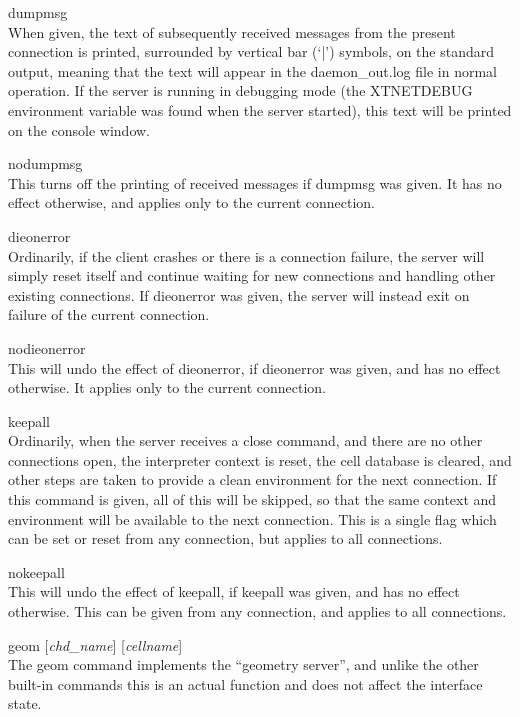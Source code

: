\begin{description}
\item{\vt dumpmsg}\\
When given, the text of subsequently received messages from the
present connection is printed, surrounded by vertical bar (`{\vt |}')
symbols, on the standard output, meaning that the text will appear in
the {\vt daemon\_out.log} file in normal operation.  If the server is
running in debugging mode (the {\et XTNETDEBUG} environment variable
was found when the server started), this text will be printed on the
console window.

\item{\vt nodumpmsg}\\
This turns off the printing of received messages if {\vt dumpmsg} was
given.  It has no effect otherwise, and applies only to the current
connection.

\item{\vt dieonerror}\\
Ordinarily, if the client crashes or there is a connection failure,
the server will simply reset itself and continue waiting for new
connections and handling other existing connections.  If {\vt
dieonerror} was given, the server will instead exit on failure of the
current connection.

\item{\vt nodieonerror}\\
This will undo the effect of {\vt dieonerror}, if {\vt dieonerror} was
given, and has no effect otherwise.  It applies only to the current
connection.

\item{\vt keepall}\\
Ordinarily, when the server receives a {\vt close} command, and there
are no other connections open, the interpreter context is reset, the
cell database is cleared, and other steps are taken to provide a clean
environment for the next connection.  If this command is given, all of
this will be skipped, so that the same context and environment will be
available to the next connection.  This is a single flag which can be
set or reset from any connection, but applies to all connections.

\item{\vt nokeepall}\\
This will undo the effect of {\vt keepall}, if {\vt keepall} was
given, and has no effect otherwise.  This can be given from any
connection, and applies to all connections.

\item{\vt geom} [{\it chd\_name\/}] [{\it cellname\/}]\\
The {\vt geom} command implements the ``geometry server'', and unlike
the other built-in commands this is an actual function and does not
affect the interface state.


\end{description}
